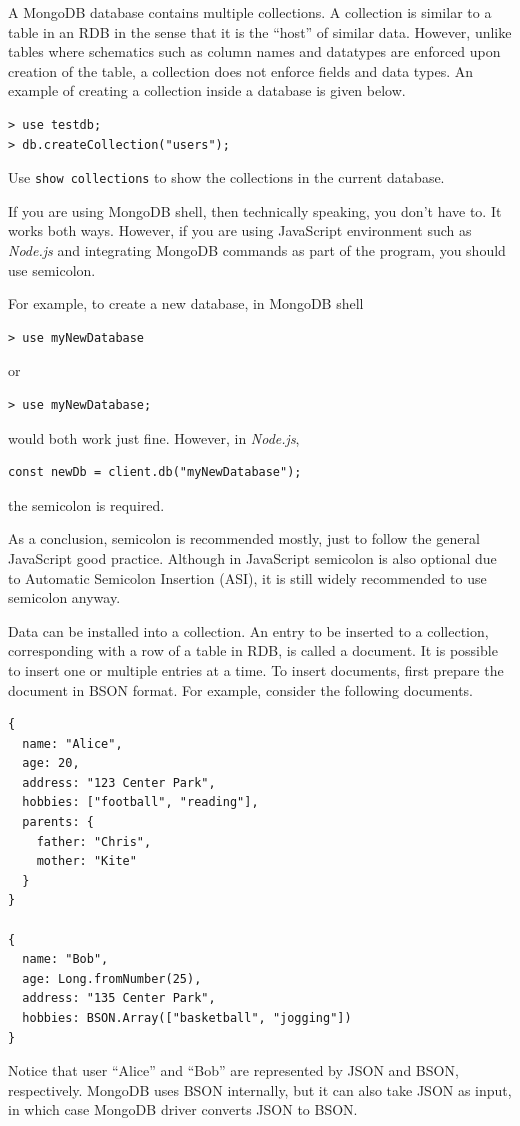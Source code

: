 A MongoDB database contains multiple collections. A collection is similar to a table in an RDB in the sense that it is the ``host'' of similar data. However, unlike tables where schematics such as column names and datatypes are enforced upon creation of the table, a collection does not enforce fields and data types. An example of creating a collection inside a database is given below.
\begin{lstlisting}
> use testdb;
> db.createCollection("users");
\end{lstlisting}
Use \verb|show collections| to show the collections in the current database.

\begin{shortbox}

If you are using MongoDB shell, then technically speaking, you don't have to. It works both ways. However, if you are using JavaScript environment such as \textit{Node.js} and integrating MongoDB commands as part of the program, you should use semicolon.

For example, to create a new database, in MongoDB shell
\begin{lstlisting}
> use myNewDatabase
\end{lstlisting}
or
\begin{lstlisting}
> use myNewDatabase;
\end{lstlisting}
would both work just fine. However, in \textit{Node.js},
\begin{lstlisting}
const newDb = client.db("myNewDatabase");
\end{lstlisting}
the semicolon is required.

As a conclusion, semicolon is recommended mostly, just to follow the general JavaScript good practice. Although in JavaScript semicolon is also optional due to Automatic Semicolon Insertion (ASI), it is still widely recommended to use semicolon anyway.
\end{shortbox}

Data can be installed into a collection. An entry to be inserted to a collection, corresponding with a row of a table in RDB, is called a document. It is possible to insert one or multiple entries at a time. To insert documents, first prepare the document in BSON format. For example, consider the following documents.
\begin{lstlisting}
{
  name: "Alice",
  age: 20,
  address: "123 Center Park",
  hobbies: ["football", "reading"],
  parents: {
    father: "Chris",
    mother: "Kite"
  }
}

{
  name: "Bob",
  age: Long.fromNumber(25),
  address: "135 Center Park",
  hobbies: BSON.Array(["basketball", "jogging"])
}
\end{lstlisting}
Notice that user ``Alice'' and ``Bob'' are represented by JSON and BSON, respectively. MongoDB uses BSON internally, but it can also take JSON as input, in which case MongoDB driver converts JSON to BSON.

